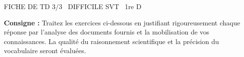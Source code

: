 \documentclass[11pt]{article}
\begin{document}
\begin{tcolorbox}[enhanced,colback=popink,colframe=popink,arc=10pt,boxrule=0pt,left=12pt,right=12pt,top=9pt,bottom=9pt]
{\color{white}\popxbold\small FICHE DE TD 3/3 \textbullet\ DIFFICILE \hfill SVT \textbullet\ 1re D\par}
\end{tcolorbox}
\vspace{4pt}
\noindent\textbf{Consigne :} Traitez les exercices ci-dessous en justifiant rigoureusement chaque réponse par l'analyse des documents fournis et la mobilisation de vos connaissances. La qualité du raisonnement scientifique et la précision du vocabulaire seront évaluées.
\end{document}
